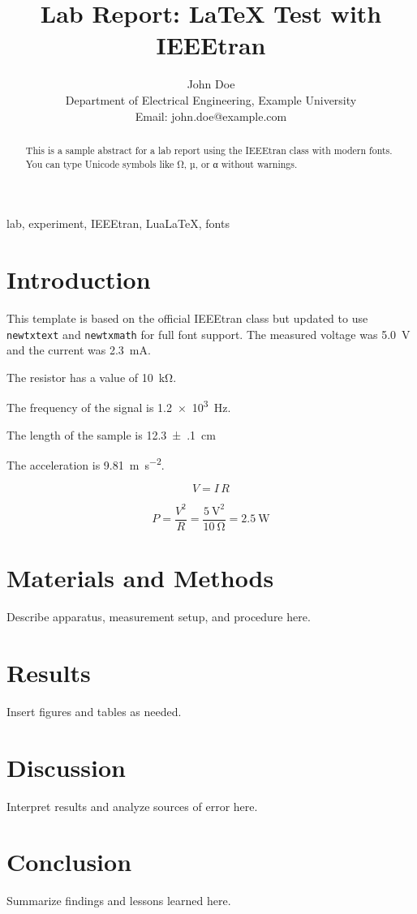 \documentclass[conference]{IEEEtran}
\begin{document}
\title{Lab Report: \LaTeX{} Test with IEEEtran}

\author{%
    John Doe \\
    Department of Electrical Engineering, Example University \\
    Email: john.doe@example.com
}

\maketitle

\begin{abstract}
This is a sample abstract for a lab report using the IEEEtran class
with modern fonts. You can type Unicode symbols like Ω, µ, or α
without warnings.
\end{abstract}

\begin{IEEEkeywords}
lab, experiment, IEEEtran, LuaLaTeX, fonts
\end{IEEEkeywords}

\section{Introduction}
This template is based on the official IEEEtran class but updated
to use \texttt{newtxtext} and \texttt{newtxmath} for full font support.
The measured voltage was \SI{5.0}{\volt} and the current was \SI{2.3}{\milli\ampere}.

The resistor has a value of \SI{10}{\kilo\ohm}.

The frequency of the signal is \SI{1.2e3}{\hertz}.

The length of the sample is \SI{12.3(1)}{\centi\meter} %

The acceleration is \SI{9.81}{\meter\per\second\squared}.

\begin{equation}
V = I \, R
\end{equation}

\begin{equation}
P = \frac{V^2}{R} = \frac{\SI{5}{\volt}^2}{\SI{10}{\ohm}} = \SI{2.5}{\watt}
\end{equation}



\section{Materials and Methods}
Describe apparatus, measurement setup, and procedure here.

\section{Results}
Insert figures and tables as needed.

\section{Discussion}
Interpret results and analyze sources of error here.

\section{Conclusion}
Summarize findings and lessons learned here.


\end{document}
